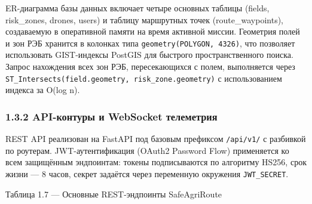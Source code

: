 \documentclass[14pt,a4paper]{extarticle}
\begin{document}
ER-диаграмма базы данных включает четыре основных таблицы (fields, risk\_zones, drones, users) и таблицу маршрутных точек (route\_waypoints), создаваемую в оперативной памяти на время активной миссии. Геометрия полей и зон РЭБ хранится в колонках типа \texttt{geometry(POLYGON,\ 4326)}, что позволяет использовать GIST-индексы PostGIS для быстрого пространственного поиска. Запрос нахождения всех зон РЭБ, пересекающихся с полем, выполняется через \texttt{ST\_Intersects(field.geometry,\ risk\_zone.geometry)} с использованием индекса за O(log n).

\hypertarget{api-ux43aux43eux43dux442ux443ux440ux44b-ux438-websocket-ux442ux435ux43bux435ux43cux435ux442ux440ux438ux44f}{%
\subsubsection{1.3.2 API-контуры и WebSocket телеметрия}\label{api-ux43aux43eux43dux442ux443ux440ux44b-ux438-websocket-ux442ux435ux43bux435ux43cux435ux442ux440ux438ux44f}}

REST API реализован на FastAPI под базовым префиксом \texttt{/api/v1/} с разбивкой по роутерам. JWT-аутентификация (OAuth2 Password Flow) применяется ко всем защищённым эндпоинтам: токены подписываются по алгоритму HS256, срок жизни --- 8 часов, секрет задаётся через переменную окружения \texttt{JWT\_SECRET}.

Таблица 1.7 --- Основные REST-эндпоинты SafeAgriRoute
\end{document}
